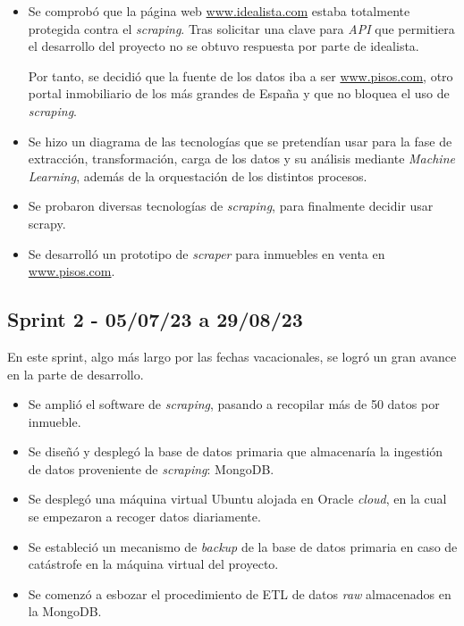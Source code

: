 \begin{itemize}
    \item Se comprobó que la página web \url{www.idealista.com} estaba totalmente protegida contra el \textit{scraping}. Tras solicitar una clave para \textit{API} que permitiera el desarrollo del proyecto no se obtuvo respuesta por parte de idealista.

    Por tanto, se decidió que la fuente de los datos iba a ser \url{www.pisos.com}, otro portal inmobiliario de los más grandes de España y que no bloquea el uso de \textit{scraping}.
    \item Se hizo un diagrama de las tecnologías que se pretendían usar para la fase de extracción, transformación, carga de los datos y su análisis mediante \textit{Machine Learning}, además de la orquestación de los distintos procesos.
    \item Se probaron diversas tecnologías de \textit{scraping}, para finalmente decidir usar scrapy.
    \item Se desarrolló un prototipo de \textit{scraper} para inmuebles en venta en \url{www.pisos.com}.
\end{itemize}

\subsection{Sprint 2 - 05/07/23 a 29/08/23}

En este sprint, algo más largo por las fechas vacacionales, se logró un gran avance en la parte de desarrollo.

\begin{itemize}
    \item Se amplió el software de \textit{scraping}, pasando a recopilar más de 50 datos por inmueble.
    \item Se diseñó y desplegó la base de datos primaria que almacenaría la ingestión de datos proveniente de \textit{scraping}: MongoDB.
    \item Se desplegó una máquina virtual Ubuntu alojada en Oracle \textit{cloud}, en la cual se empezaron a recoger datos diariamente.
    \item Se estableció un mecanismo de \textit{backup} de la base de datos primaria en caso de catástrofe en la máquina virtual del proyecto.
    \item Se comenzó a esbozar el procedimiento de ETL de datos \textit{raw} almacenados en la MongoDB.
\end{itemize}

